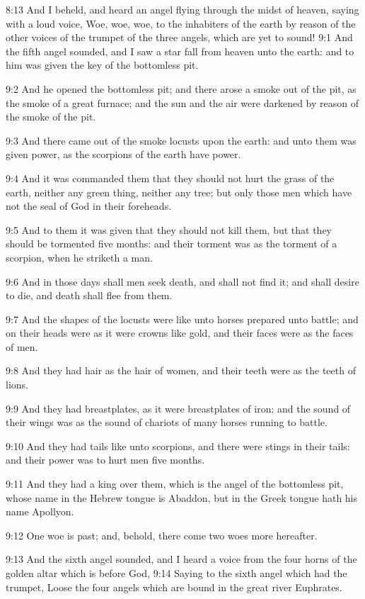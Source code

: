 8:13 And I beheld, and heard an angel flying through the midst of heaven, saying with a loud voice, Woe, woe, woe, to the inhabiters of the earth by reason of the other voices of the trumpet of the three angels, which are yet to sound!  9:1 And the fifth angel sounded, and I saw a star fall from heaven unto the earth: and to him was given the key of the bottomless pit.

9:2 And he opened the bottomless pit; and there arose a smoke out of the pit, as the smoke of a great furnace; and the sun and the air were darkened by reason of the smoke of the pit.

9:3 And there came out of the smoke locusts upon the earth: and unto them was given power, as the scorpions of the earth have power.

9:4 And it was commanded them that they should not hurt the grass of the earth, neither any green thing, neither any tree; but only those men which have not the seal of God in their foreheads.

9:5 And to them it was given that they should not kill them, but that they should be tormented five months: and their torment was as the torment of a scorpion, when he striketh a man.

9:6 And in those days shall men seek death, and shall not find it; and shall desire to die, and death shall flee from them.

9:7 And the shapes of the locusts were like unto horses prepared unto battle; and on their heads were as it were crowns like gold, and their faces were as the faces of men.

9:8 And they had hair as the hair of women, and their teeth were as the teeth of lions.

9:9 And they had breastplates, as it were breastplates of iron; and the sound of their wings was as the sound of chariots of many horses running to battle.

9:10 And they had tails like unto scorpions, and there were stings in their tails: and their power was to hurt men five months.

9:11 And they had a king over them, which is the angel of the bottomless pit, whose name in the Hebrew tongue is Abaddon, but in the Greek tongue hath his name Apollyon.

9:12 One woe is past; and, behold, there come two woes more hereafter.

9:13 And the sixth angel sounded, and I heard a voice from the four horns of the golden altar which is before God, 9:14 Saying to the sixth angel which had the trumpet, Loose the four angels which are bound in the great river Euphrates.

